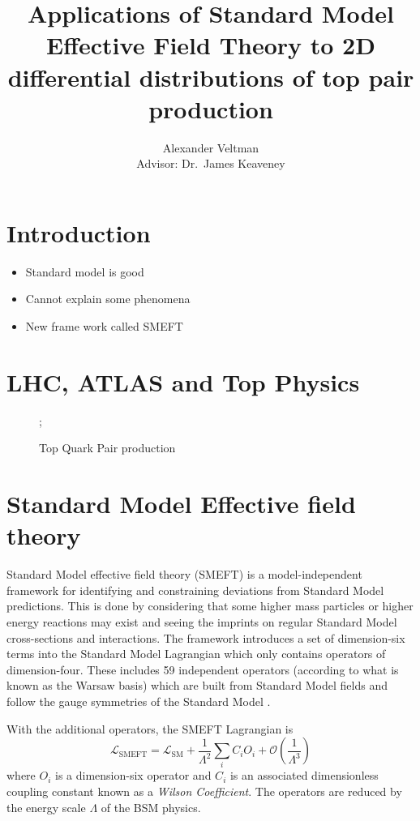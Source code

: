 \documentclass[a4paper]{article}
\title{Applications of Standard Model Effective Field Theory to 2D differential distributions of top pair production}
\author{Alexander Veltman\\{\small Advisor: Dr.\ James Keaveney}}
\affil{Department of Physics,\\University of Cape Town}
\begin{document}
\maketitle

\begin{abstract}
\end{abstract}

\section{Introduction}

\begin{itemize}
    \item Standard model is good
    \item Cannot explain some phenomena
    \item New frame work called SMEFT
\end{itemize}

\section{LHC, ATLAS and Top Physics}

\begin{figure}[h]
    \centering
    ;
    \caption{Top Quark Pair production}
\end{figure}


\section{Standard Model Effective field theory}

Standard Model effective field theory (SMEFT) is a model-independent framework for identifying and constraining deviations from Standard Model predictions.
This is done by considering that some higher mass particles or higher energy reactions may exist and seeing the imprints on regular Standard Model cross-sections and interactions.
The framework introduces a set of dimension-six terms into the Standard Model Lagrangian which only contains operators of dimension-four.
These includes 59 independent operators (according to what is known as the Warsaw basis) which are built from Standard Model fields and follow the gauge symmetries of the Standard Model \cite{Grzadkowski_2010}.


With the additional operators, the SMEFT Lagrangian is
\begin{equation}\label{eq:smeft_lagrangian}
    \mathcal{L}_{\text{SMEFT}} = \mathcal{L}_{\text{SM}} + \frac{1}{\Lambda^2} \sum\limits_{i} C_{i} O_{i} + \mathcal{O}\left(\frac{1}{\Lambda^3}\right)
\end{equation}
where $O_{i}$ is a dimension-six operator and $C_{i}$ is an associated dimensionless coupling constant known as a \emph{Wilson Coefficient}.
The operators are reduced by the energy scale $\Lambda$ of the BSM physics.
\end{document}
